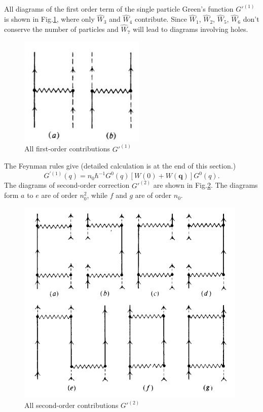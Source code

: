 \documentclass[12pt]{article}
\begin{document}
All diagrams of the first order term of the single particle Green's function 
$G'^{(1)}$ is shown in Fig.\ref{img3}, where only $\hat{W}_3$ and $\hat{W}_4$ 
contribute. Since $\hat{W}_1$, $\hat{W}_2$, $\hat{W}_5$, $\hat{W}_6$ don't conserve 
the number of particles and $\hat{W}_7$ will lead to diagrams involving holes.
\begin{figure}[H]
    \centering
    \includegraphics[width=6cm]{p3.jpg}
    \renewcommand{\figurename}{Fig.}
    \caption{All first-order contributions $G'^{(1)}$}
    \label{img3}
\end{figure}
\noindent The Feynman rules give (detailed calculation is at the end of this section.) 
\begin{equation}\label{Gp1}
    G^{\prime(1)}(q)=n_{0} \hbar^{-1} G^{0}(q)[W(0)+W(\mathbf{q})] G^{0}(q).
\end{equation}
\noindent The diagrams of second-order correction $G'^{(2)}$ are shown in 
Fig.\ref{img4}. The diagrams form $a$ to $e$ are of order $n_0^2$, while $f$ and 
$g$ are of order $n_0$.
\begin{figure}[H]
    \centering
    \includegraphics[width=11cm]{p4.png}
    \renewcommand{\figurename}{Fig.}
    \caption{All second-order contributions $G'^{(2)}$}
    \label{img4}
\end{figure}
\noindent\hrulefill
\end{document}
